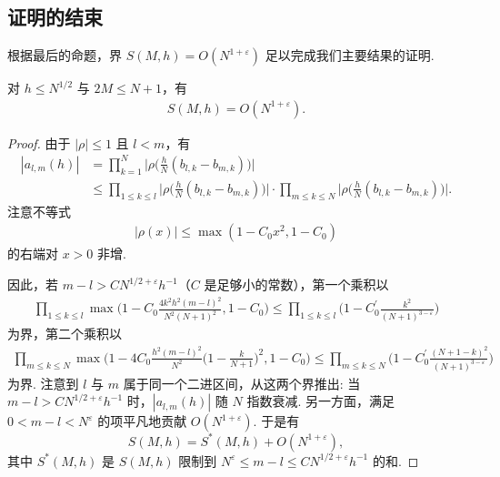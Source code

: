 \subsection{证明的结束}

根据最后的命题，界 $S(M, h) = O(N^{1+\varepsilon})$ 足以完成我们主要结果的证明.

\begin{proposition}\label{prop:7.18}
对 $h \leq N^{1/2}$ 与 $2M \leq N + 1$，有
\begin{align*}
  S(M,h)=O(N^{1+\varepsilon}).
\end{align*}
\end{proposition}

\begin{proof}
由于 $|\rho| \leq 1$ 且 $l < m$，有
\begin{align*}
  |a_{l,m}(h)|
  &=\prod_{k=1}^{N}\Big|\rho\Big(\frac{h}{N}(b_{l,k}-b_{m,k})\Big)\Big|\\
  &\leq\prod_{1\leq k\leq l}\Big|\rho\Big(\frac{h}{N}(b_{l,k}-b_{m,k})\Big)\Big|
   \cdot\prod_{m\leq k\leq N}\Big|\rho\Big(\frac{h}{N}(b_{l,k}-b_{m,k})\Big)\Big|.
\end{align*}
注意不等式
\begin{align*}
  |\rho(x)|\leq\max(1-C_{0}x^{2},1-C_{0})
\end{align*}
的右端对 $x > 0$ 非增.

因此，若 $m - l > CN^{1/2+\varepsilon}h^{-1}$（$C$ 是足够小的常数），第一个乘积以
\begin{align*}
  \prod_{1\leq k\leq l}\max\Big(1-C_{0}\frac{4k^{2}h^{2}(m-l)^{2}}{N^{2}(N+1)^{2}},1-C_{0}\Big)
  \leq\prod_{1\leq k\leq l}\Big(1-C_{0}^{\prime}\frac{k^{2}}{(N+1)^{3-\varepsilon}}\Big)
\end{align*}
为界，第二个乘积以
\begin{align*}
  \prod_{m\leq k\leq N}\max\Big(1-4C_{0}\frac{h^{2}(m-l)^{2}}{N^{2}}
  \Big(1-\frac{k}{N+1}\Big)^{2},1-C_{0}\Big)
  \leq\prod_{m\leq k\leq N}\Big(1-C_{0}^{\prime}\frac{(N+1-k)^{2}}{(N+1)^{3-\varepsilon}}\Big)
\end{align*}
为界. 注意到 $l$ 与 $m$ 属于同一个二进区间，从这两个界推出: 当 $m-l > CN^{1/2+\varepsilon}h^{-1}$ 时，$|a_{l,m}(h)|$ 随 $N$ 指数衰减. 另一方面，满足 $0 < m-l < N^{\varepsilon}$ 的项平凡地贡献 $O(N^{1+\varepsilon})$. 于是有
\begin{equation}\label{eq:7.11}
  S(M,h)=S^{*}(M,h)+O(N^{1+\varepsilon}),
\end{equation}
其中 $S^*(M,h)$ 是 $S(M,h)$ 限制到 $N^{\varepsilon} \leq m - l \leq CN^{1/2+\varepsilon}h^{-1}$ 的和.


\end{proof}
